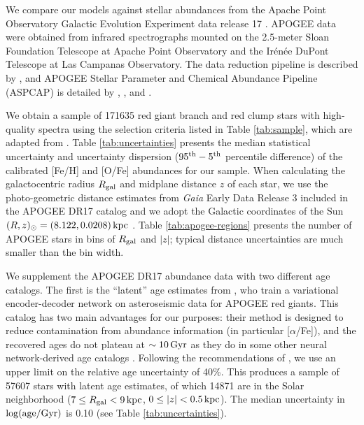 \documentclass[twocolumn,twocolappendix,linenumbers]{aastex631}
\begin{document}
We compare our models against stellar abundances from the Apache Point Observatory Galactic Evolution Experiment \citep[APOGEE;][]{majewski_apache_2017} data release 17 \citep[DR17;][]{abdurrouf_seventeenth_2022}. APOGEE data were obtained from infrared spectrographs \citep{wilson_apache_2019} mounted on the 2.5-meter Sloan Foundation Telescope \citep{gunn_25_2006} at Apache Point Observatory and the Ir{\'e}n{\'e}e DuPont Telescope \citep{bowen_optical_1973} at Las Campanas Observatory. The data reduction pipeline is described by \citet{nidever_data_2015}, and APOGEE Stellar Parameter and Chemical Abundance Pipeline (ASPCAP) is detailed by \citet{holtzman_abundances_2015}, \citet{garcia_perez_aspcap_2016}, and \citet{jonsson_apogee_2020}.

We obtain a sample of \num{171635} red giant branch and red clump stars with high-quality spectra using the selection criteria listed in Table \ref{tab:sample}, which are adapted from \citet{hayden_chemical_2015}. Table \ref{tab:uncertainties} presents the median statistical uncertainty and uncertainty dispersion ($95^{\rm th} - 5^{\rm th}$ percentile difference) of the calibrated [Fe/H] and [O/Fe] abundances for our sample. When calculating the galactocentric radius $R_{\rm gal}$ and midplane distance $z$ of each star, we use the \citet{bailer-jones_estimating_2021} photo-geometric distance estimates from {\it Gaia} Early Data Release 3 \citep{gaia_collaboration_gaia_2016,gaia_collaboration_gaia_2021} included in the APOGEE DR17 catalog and we adopt the Galactic coordinates of the Sun $(R,z)_\odot=(8.122, 0.0208)\,{\rm kpc}$ \citep{gravity_collaboration_detection_2018,bennett_vertical_2019}. Table \ref{tab:apogee-regions} presents the number of APOGEE stars in bins of $R_{\rm gal}$ and $|z|$; typical distance uncertainties are much smaller than the bin width.

We supplement the APOGEE DR17 abundance data with two different age catalogs. The first is the ``latent'' age estimates from \citet{leung_variational_2023}, who train a variational encoder-decoder network on asteroseismic data for APOGEE red giants. This catalog has two main advantages for our purposes: their method is designed to reduce contamination from abundance information (in particular [$\alpha$/Fe]), and the recovered ages do not plateau at $\sim10\,{\rm Gyr}$ as they do in some other neural network-derived age catalogs \citep[e.g.,][]{mackereth_dynamical_2019}. Following the recommendations of \citet{leung_variational_2023}, we use an upper limit on the relative age uncertainty of 40\%. This produces a sample of \num{57607} stars with latent age estimates, of which \num{14871} are in the Solar neighborhood ($7\leq R_{\rm gal}<9\,{\rm kpc}$, $0\leq|z|<0.5\,{\rm kpc}$). The median uncertainty in $\log({\rm age}/{\rm Gyr})$ is 0.10 (see Table \ref{tab:uncertainties}).
\end{document}

